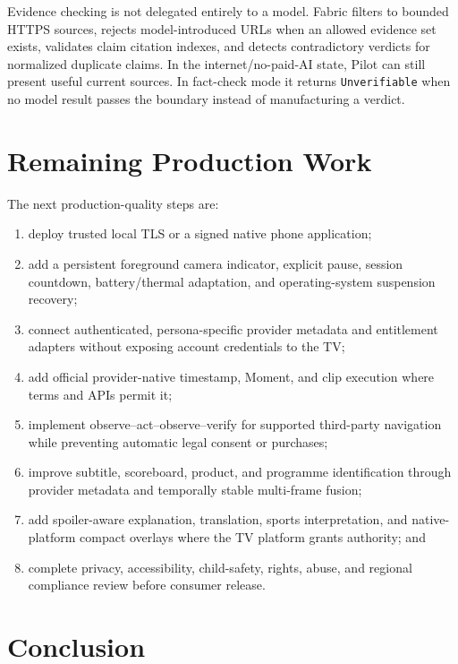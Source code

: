 \documentclass[11pt,a4paper]{article}
\begin{document}
Evidence checking is not delegated entirely to a model.  Fabric filters to
bounded HTTPS sources, rejects model-introduced URLs when an allowed evidence
set exists, validates claim citation indexes, and detects contradictory
verdicts for normalized duplicate claims.  In the internet/no-paid-AI state,
Pilot can still present useful current sources.  In fact-check mode it returns
\texttt{Unverifiable} when no model result passes the boundary instead of
manufacturing a verdict.

\section{Remaining Production Work}

The next production-quality steps are:

\begin{enumerate}[leftmargin=*]
  \item deploy trusted local TLS or a signed native phone application;
  \item add a persistent foreground camera indicator, explicit pause, session
        countdown, battery/thermal adaptation, and operating-system suspension
        recovery;
  \item connect authenticated, persona-specific provider metadata and
        entitlement adapters without exposing account credentials to the TV;
  \item add official provider-native timestamp, Moment, and clip execution
        where terms and APIs permit it;
  \item implement observe--act--observe--verify for supported third-party
        navigation while preventing automatic legal consent or purchases;
  \item improve subtitle, scoreboard, product, and programme identification
        through provider metadata and temporally stable multi-frame fusion;
  \item add spoiler-aware explanation, translation, sports interpretation, and
        native-platform compact overlays where the TV platform grants authority; and
  \item complete privacy, accessibility, child-safety, rights, abuse, and
        regional compliance review before consumer release.
\end{enumerate}

\section{Conclusion}
\end{document}
